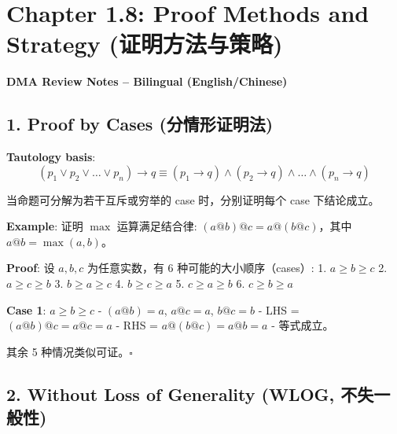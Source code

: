 \documentclass[10pt,a4paper,openany]{ctexbook}
\theoremstyle{definition}
\theoremstyle{remark}
\renewenvironment{quote}
  {\list{}{\leftmargin=1em\rightmargin=0pt\topsep=0.5pt\partopsep=0pt}\item[]}
  {\endlist}
\begin{document}
\section{Chapter 1.8: Proof Methods and Strategy (证明方法与策略)}

\begin{quote}
\textbf{DMA Review Notes -- Bilingual (English/Chinese)}

\end{quote}
\vspace{-2pt}

\subsection{1. Proof by Cases (分情形证明法)}

\textbf{Tautology basis}:
\[
(p_1 \lor p_2 \lor \dots \lor p_n) \to q \equiv (p_1 \to q) \land (p_2 \to q) \land \dots \land (p_n \to q)
\]

\begin{quote}
当命题可分解为若干互斥或穷举的 case 时，分别证明每个 case 下结论成立。

\textbf{Example}: 证明 $\max$ 运算满足结合律: $(a @ b) @ c = a @ (b @ c)$，其中 $a @ b = \max(a,b)$。

\textbf{Proof}: 设 $a, b, c$ 为任意实数，有 6 种可能的大小顺序（cases）:
1. $a \geq b \geq c$
2. $a \geq c \geq b$
3. $b \geq a \geq c$
4. $b \geq c \geq a$
5. $c \geq a \geq b$
6. $c \geq b \geq a$

\textbf{Case 1}: $a \geq b \geq c$
- $(a @ b) = a$, $a @ c = a$, $b @ c = b$
- LHS = $(a @ b) @ c = a @ c = a$
- RHS = $a @ (b @ c) = a @ b = a$
- 等式成立。

其余 5 种情况类似可证。$\square$

\end{quote}
\vspace{-2pt}

\subsection{2. Without Loss of Generality (WLOG, 不失一般性)}
\end{document}
